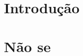 \documentclass[10pt]{report}
\begin{document}



%

% 

\tableofcontents




\doublespacing
\chapter{Introdução}\label{cap-introducao}


\chapter{Não se}\label{cap-nao}



%

%

{} %

\end{document}
